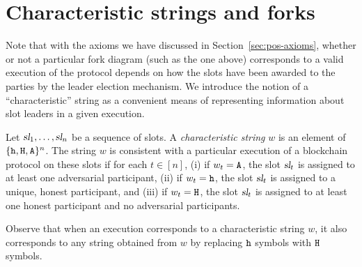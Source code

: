 \section{Characteristic strings and forks}\label{sec:char-string-mh}
Note that with the axioms we have discussed in Section~\ref{sec:pos-axioms}, 
whether or not a
particular fork diagram (such as the one 
above) 
corresponds to a valid
execution of the protocol depends on how the slots have been awarded to the parties by the
leader election mechanism. We introduce the notion of a ``characteristic'' string as a convenient
means of representing information about slot leaders in a given execution.
\begin{definition}\label{def:trivalent-char-string}
  Let $\textsl{sl}_1, \ldots, \textsl{sl}_{n}$ be a sequence of slots.  A
  \emph{characteristic string} $w$ is an element of
  $\{\mathtt{h},\mathtt{H},\mathtt{A}\}^n$. The string $w$ is consistent with a particular
  execution of a blockchain protocol on these slots if for each
  $t \in [n]$, (i) if $w_t = \mathtt{A}$, the slot $\textsl{sl}_t$ is assigned to
  at least one adversarial participant, (ii) if $w_t = \mathtt{h}$, the slot
  $\textsl{sl}_{t}$ is assigned to a unique, honest participant, and (iii)
  if $w_t = \mathtt{H}$, the slot $\textsl{sl}_{t}$ is assigned to at least one
  honest participant and no adversarial participants.

  Observe that when an execution corresponds to a characteristic
  string $w$, it also corresponds to any string obtained from $w$ by
  replacing $\mathtt{h}$ symbols with $\mathtt{H}$ symbols.
% 
\end{definition}
